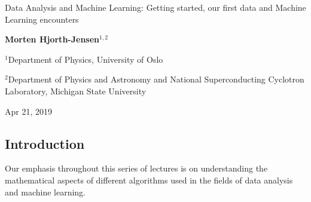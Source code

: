 \documentclass[%
oneside,                 %
final,                   %
10pt]{article}
\begin{document}

\newcommand{\exercisesection}[1]{\subsection*{#1}}






\thispagestyle{empty}

\begin{center}
{\LARGE\bf
\begin{spacing}{1.25}
Data Analysis and Machine Learning: Getting started, our first data and Machine Learning encounters
\end{spacing}
}
\end{center}


\begin{center}
{\bf Morten Hjorth-Jensen${}^{1, 2}$} \\ [0mm]
\end{center}

\begin{center}
\centerline{{\small ${}^1$Department of Physics, University of Oslo}}
\centerline{{\small ${}^2$Department of Physics and Astronomy and National Superconducting Cyclotron Laboratory, Michigan State University}}
\end{center}
    

\begin{center}
Apr 21, 2019
\end{center}

\vspace{1cm}


\subsection*{Introduction}

Our emphasis throughout this series of lectures  
is on understanding the mathematical aspects of
different algorithms used in the fields of data analysis and machine learning. 
\end{document}
